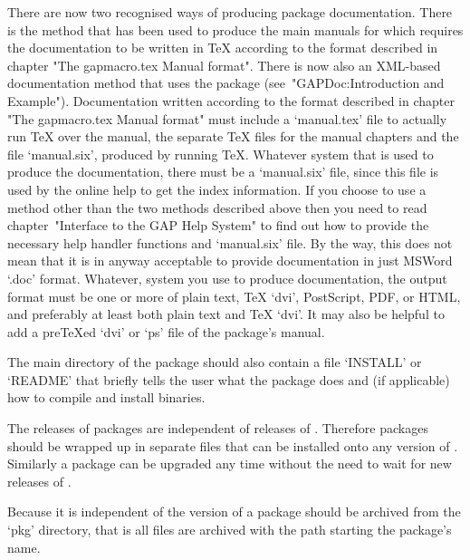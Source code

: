 There  are  now  two  recognised  ways   of   producing  {\GAP}   package
documentation. There is the method that has been used to produce the main
manuals for {\GAP} which requires the  documentation  to  be  written  in
{\TeX} according to the format described  in  chapter  "The  gapmacro.tex
Manual format". There is now also an XML-based documentation method  that
uses the  package (see~"GAPDoc:Introduction and Example").
Documentation written according to the format described in  chapter  "The
gapmacro.tex Manual format" must include a `manual.tex' file to  actually
run {\TeX} over the manual, the separate  {\TeX}  files  for  the  manual
chapters and the file `manual.six', produced by running {\TeX}.  Whatever
system that is used  to  produce  the  documentation,  there  must  be  a
`manual.six' file, since this file is used by the online help to get  the
index information. If you choose to use  a  method  other  than  the  two
methods described above then you need to read chapter~"Interface  to  the
GAP Help System" to find out how to provide the  necessary  help  handler
functions and `manual.six' file. By the way, this does not mean  that  it
is in anyway acceptable to provide documentation in just MSWord `.doc' format.
Whatever, system you use to produce documentation, the output format must
be one or more of plain text, {\TeX} `dvi', PostScript, PDF, or HTML, and
preferably at least both plain text and {\TeX}  `dvi'.  It  may  also  be
helpful to add a pre{\TeX}ed `dvi' or `ps' file of the package's manual.

The main directory of the {\GAP} package should also contain a file `INSTALL'
or `README' that briefly tells the user what the package does and (if
applicable) how to compile and install binaries.


The releases of {\GAP} packages are independent of releases of {\GAP}.
Therefore {\GAP} packages should be wrapped up in separate files that can be
installed onto any version of {\GAP}. Similarly a {\GAP} package can be
upgraded any time without the need to wait for new releases of {\GAP}.

Because it is independent of the version of {\GAP} a {\GAP} package should be
archived from the {\GAP} `pkg'  directory, that is all files are archived with
the path starting the package's name.

